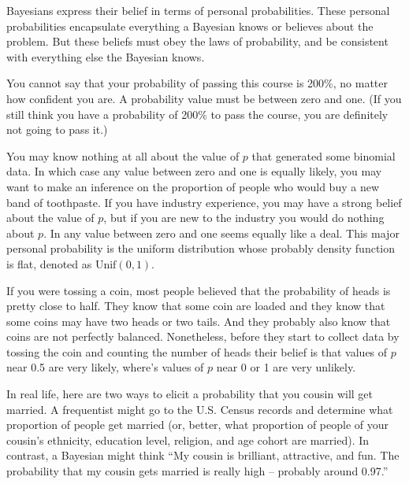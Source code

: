 \documentclass[]{book}
\theoremstyle{definition}
\theoremstyle{definition}
\theoremstyle{definition}
\theoremstyle{remark}
\let\BeginKnitrBlock\begin \let\EndKnitrBlock\end
\begin{document}
Bayesians express their belief in terms of personal probabilities. These
personal probabilities encapsulate everything a Bayesian knows or
believes about the problem. But these beliefs must obey the laws of
probability, and be consistent with everything else the Bayesian knows.

\BeginKnitrBlock{example}
\protect\hypertarget{exm:200percent}{}\label{exm:200percent} You cannot say
that your probability of passing this course is 200\%, no matter how
confident you are. A probability value must be between zero and one. (If
you still think you have a probability of 200\% to pass the course, you
are definitely not going to pass it.)
\EndKnitrBlock{example}

\BeginKnitrBlock{example}
\protect\hypertarget{exm:binomial-data}{}\label{exm:binomial-data} You may
know nothing at all about the value of \(p\) that generated some
binomial data. In which case any value between zero and one is equally
likely, you may want to make an inference on the proportion of people
who would buy a new band of toothpaste. If you have industry experience,
you may have a strong belief about the value of \(p\), but if you are
new to the industry you would do nothing about \(p\). In any value
between zero and one seems equally like a deal. This major personal
probability is the uniform distribution whose probably density function
is flat, denoted as \(\text{Unif}(0,1)\).
\EndKnitrBlock{example}

\BeginKnitrBlock{example}
\protect\hypertarget{exm:coin-toss}{}\label{exm:coin-toss} If you were
tossing a coin, most people believed that the probability of heads is
pretty close to half. They know that some coin are loaded and they know
that some coins may have two heads or two tails. And they probably also
know that coins are not perfectly balanced. Nonetheless, before they
start to collect data by tossing the coin and counting the number of
heads their belief is that values of \(p\) near 0.5 are very likely,
where's values of \(p\) near 0 or 1 are very unlikely.
\EndKnitrBlock{example}

\BeginKnitrBlock{example}
\protect\hypertarget{exm:marriage}{}\label{exm:marriage} In real life, here
are two ways to elicit a probability that you cousin will get married. A
frequentist might go to the U.S. Census records and determine what
proportion of people get married (or, better, what proportion of people
of your cousin's ethnicity, education level, religion, and age cohort
are married). In contrast, a Bayesian might think ``My cousin is
brilliant, attractive, and fun. The probability that my cousin gets
married is really high -- probably around 0.97.''
\EndKnitrBlock{example}
\end{document}
